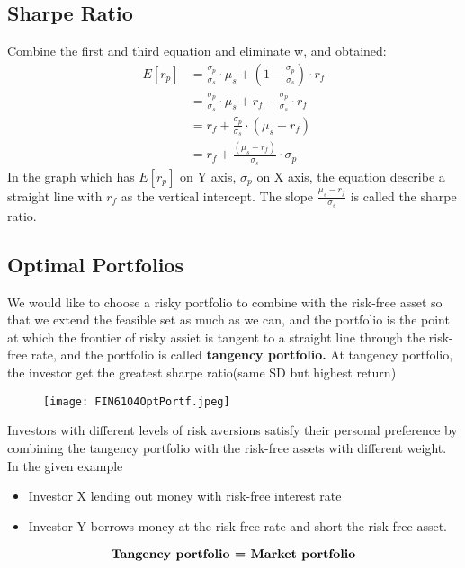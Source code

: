 \documentclass{article}
\theoremstyle{definition}
\theoremstyle{thrm}
\theoremstyle{lma}
\theoremstyle{ppst}
\theoremstyle{crlr}
\begin{document}
\subsection{Sharpe Ratio}
Combine the first and third equation and eliminate w, and obtained:
\begin{align*}
	E[r_p] &= \frac{\sigma_p}{\sigma_s}\cdot \mu_s+(1-\frac{\sigma_p}{\sigma_s})\cdot r_f\\
	&=\frac{\sigma_p}{\sigma_s}\cdot \mu_s+ r_f-\frac{\sigma_p}{\sigma_s}\cdot r_f\\
	&= r_f+\frac{\sigma_p}{\sigma_s}\cdot (\mu_s-r_f)\\
	&=r_f+\frac{(\mu_s-r_f)}{\sigma_s}\cdot \sigma_p
\end{align*}
In the graph which has $E[r_p]$ on Y axis, $\sigma_p$ on X axis, the equation describe a straight line with $r_f$ as the vertical intercept. The slope $\frac{\mu_s-r_f}{\sigma_s}$ is called the sharpe ratio. 

\subsection{Optimal Portfolios}
We would like to choose a risky portfolio to combine with the risk-free asset so that we extend the feasible set as much as we can, and the portfolio is the point at which the frontier of risky assiet is tangent to a straight line through the risk-free rate, and the portfolio is called \textbf{tangency portfolio. } At tangency portfolio, the investor get the greatest sharpe ratio(same SD but highest return)\\
\begin{figure}
	\centering
    \texttt{[image: FIN6104OptPortf.jpeg]}
\end{figure} 
Investors with different levels of risk aversions satisfy their personal preference by combining the tangency portfolio with the risk-free assets with different weight. In the given example
\begin{itemize}
	\item Investor X lending out money with risk-free interest rate
	\item Investor Y borrows money at the risk-free rate and short the risk-free asset.
\end{itemize}
\begin{align*}
	\text{\textbf{Tangency portfolio = Market portfolio}}
\end{align*}
\end{document}
